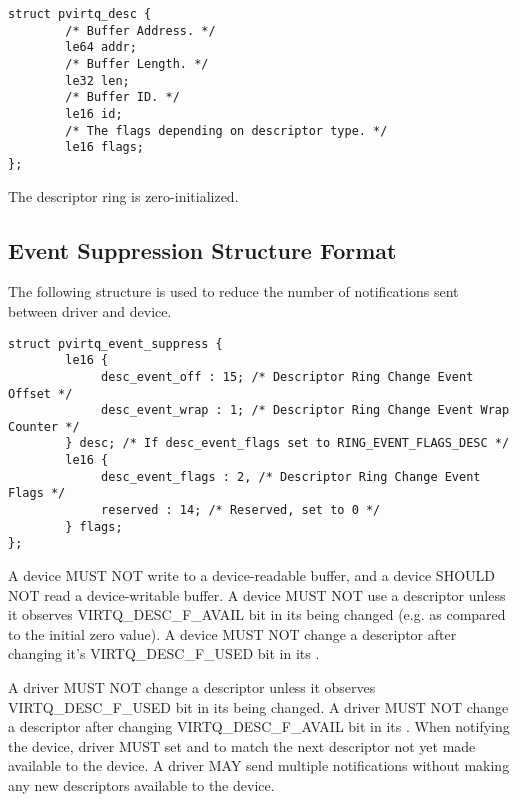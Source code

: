 \begin{lstlisting}
struct pvirtq_desc {
        /* Buffer Address. */
        le64 addr;
        /* Buffer Length. */
        le32 len;
        /* Buffer ID. */
        le16 id;
        /* The flags depending on descriptor type. */
        le16 flags;
};
\end{lstlisting}

The descriptor ring is zero-initialized.

\subsection{Event Suppression Structure Format}\label{sec:Basic
Facilities of a Virtio Device / Packed Virtqueues / Event Suppression Structure
Format}

The following structure is used to reduce the number of
notifications sent between driver and device.

\begin{lstlisting}
struct pvirtq_event_suppress {
        le16 {
             desc_event_off : 15; /* Descriptor Ring Change Event Offset */
             desc_event_wrap : 1; /* Descriptor Ring Change Event Wrap Counter */
        } desc; /* If desc_event_flags set to RING_EVENT_FLAGS_DESC */
        le16 {
             desc_event_flags : 2, /* Descriptor Ring Change Event Flags */
             reserved : 14; /* Reserved, set to 0 */
        } flags;
};
\end{lstlisting}

A device MUST NOT write to a device-readable buffer, and a device SHOULD NOT
read a device-writable buffer.
A device MUST NOT use a descriptor unless it observes
VIRTQ_DESC_F_AVAIL bit in its  being changed
(e.g. as compared to the initial zero value).
A device MUST NOT change a descriptor after changing it's
VIRTQ_DESC_F_USED bit in its .

A driver MUST NOT change a descriptor unless it observes
VIRTQ_DESC_F_USED bit in its  being changed.
A driver MUST NOT change a descriptor after changing
VIRTQ_DESC_F_AVAIL bit in its .
When notifying the device, driver MUST set
 and
 to match the next descriptor
not yet made available to the device.
A driver MAY send multiple notifications without making
any new descriptors available to the device.

